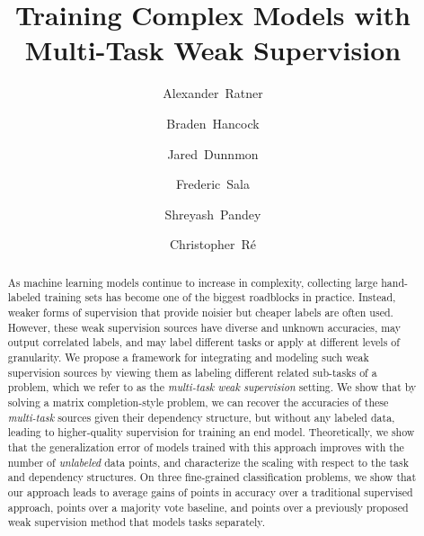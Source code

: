 \documentclass[letterpaper]{article}
\title{Training Complex Models with Multi-Task Weak Supervision}
\author[]{Alexander~Ratner}
\author[]{Braden~Hancock}
\author[]{Jared~Dunnmon}
\author[]{Frederic~Sala}
\author[]{Shreyash~Pandey}
\author[]{Christopher~R{\'e}}
\affil[]{Department of Computer Science, Stanford University}
\affil[ ]{\footnotesize{\texttt{\{ajratner, bradenjh, jdunnmon, fredsala, shreyash, chrismre\}@stanford.edu}}}
\begin{document}
\maketitle

\newcommand{\figpathA}{fig/LF_example2b_wide.png}
\newcommand{\figwidthA}{\textwidth}
\newcommand{\figpathB}{fig/ontonotes_scaleup_plot_log.pdf}
\newcommand{\figwidthB}{0.5\linewidth}

\newcommand{\versionswitch}[2]{#2}

\begin{abstract}
  

As machine learning models continue to increase in complexity, collecting large hand-labeled training sets has become one of the biggest roadblocks in practice.
Instead, weaker forms of supervision that provide noisier but cheaper labels are often used.
However, these weak supervision sources have diverse and unknown accuracies, may output correlated labels, and may label different tasks or apply at different levels of granularity.
We propose a framework for integrating and modeling such weak supervision sources by viewing them as labeling different related sub-tasks of a problem, which we refer to as the \textit{multi-task weak supervision} setting.
We show that by solving a matrix completion-style problem, we can recover the accuracies of these \textit{multi-task} sources given their dependency structure, but without any labeled data, leading to higher-quality supervision for training an end model.
Theoretically, we show that the generalization error of models trained with this approach improves with the number of \textit{unlabeled} data points, and characterize the scaling with respect to the task and dependency structures.
On three fine-grained classification problems, we show that our approach leads to average gains of  points in accuracy over a traditional supervised approach,  points over a majority vote baseline, and  points over a previously proposed weak supervision method that models tasks separately.
 \end{abstract}
\end{document}
